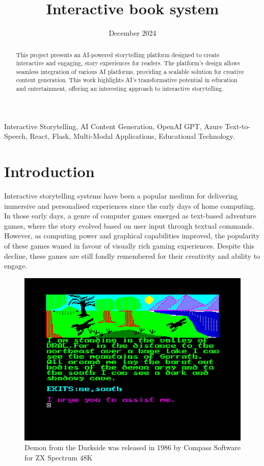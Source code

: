 \documentclass[conference]{IEEEtran}
\begin{document}
	
	\title{Interactive book system}
	
	\author{
		\date{December 2024}
	}
	
	\maketitle
	
	\begin{abstract}
		This project presents an AI-powered storytelling platform designed to create interactive and engaging, story experiences for readers. The platform's design allows seamless integration of various AI platforms, providing a scalable solution for creative content generation. This work highlights AI's transformative potential in education and entertainment, offering an interesting approach to interactive storytelling.
	\end{abstract}
	
	\begin{IEEEkeywords}
		Interactive Storytelling, AI Content Generation, OpenAI GPT, Azure Text-to-Speech, React, Flask, Multi-Modal Applications, Educational Technology.
	\end{IEEEkeywords}
	
	\section{Introduction}
	
	Interactive storytelling systems have been a popular medium for delivering immersive and personalised experiences since the early days of home computing. In those early days, a genre of computer games emerged as text-based adventure games, where the story evolved based on user input through textual commands\cite{brooker2021filling}\cite{woodcock2012zx}. However, as computing power and graphical capabilities improved, the popularity of these games waned in favour of visually rich gaming experiences. Despite this decline, these games are still fondly remembered for their creativity and ability to engage.
		
	\begin{figure}[!h]
		\centering
		\includegraphics[width=0.7\linewidth]{img/img-ari3333-project-report-adventure-games}
		\caption{Demon from the Darkside was released in 1986 by Compass Software for ZX Spectrum 48K\cite{demonfromdarkside2024}}
		\label{fig:img-ari3333-project-report-adventure-games}
	\end{figure}
		
\end{document}
